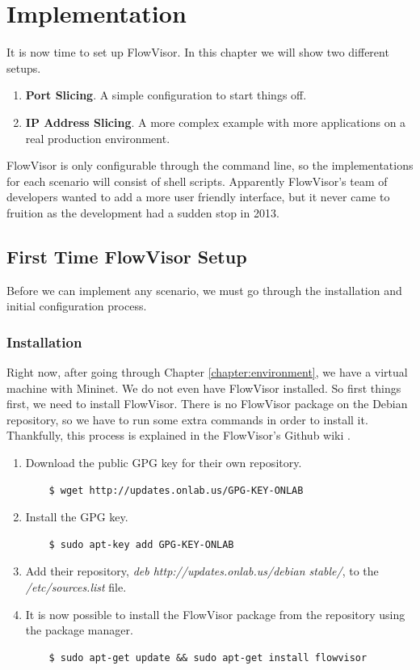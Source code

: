 \chapter{Implementation}
It is now time to set up FlowVisor. In this chapter we will show two different setups.
\begin{enumerate}
    \item \textbf{Port Slicing}. A simple configuration to start things off.
    \item \textbf{IP Address Slicing}. A more complex example with more applications on a real production environment.
\end{enumerate}

FlowVisor is only configurable through the command line, so the implementations for each scenario will consist of shell scripts. Apparently FlowVisor's team of developers wanted to add a more user friendly interface, but it never came to fruition as the development had a sudden stop in 2013.

\section{First Time FlowVisor Setup}
Before we can implement any scenario, we must go through the installation and initial configuration process.

\subsection{Installation}
Right now, after going through Chapter \ref{chapter:environment}, we have a virtual machine with Mininet. We do not even have FlowVisor installed. So first things first, we need to install FlowVisor. There is no FlowVisor package on the Debian repository, so we have to run some extra commands in order to install it. Thankfully, this process is explained in the FlowVisor's Github wiki \cite{flowvisor_github}.
\begin{enumerate}
    \item Download the public GPG key for their own repository. 
    \begin{lstlisting}
    $ wget http://updates.onlab.us/GPG-KEY-ONLAB
    \end{lstlisting}
    
   \item Install the GPG key. 
    \begin{lstlisting}
    $ sudo apt-key add GPG-KEY-ONLAB
    \end{lstlisting}
    
    \item Add their repository, \textit{deb http://updates.onlab.us/debian stable/}, to the \textit{/etc/sources.list} file.
    
    \item It is now possible to install the FlowVisor package from the repository using the package manager.
    \begin{lstlisting}
    $ sudo apt-get update && sudo apt-get install flowvisor
    \end{lstlisting}
\end{enumerate}

